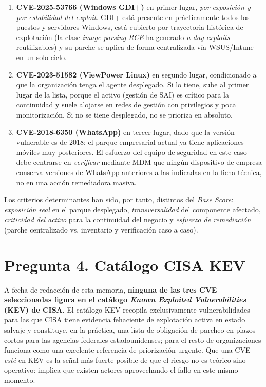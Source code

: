 \begin{enumerate}[leftmargin=*]
    \item \textbf{CVE-2025-53766 (Windows GDI+)} en primer lugar, \textit{por exposición y por estabilidad del exploit}. GDI+ está presente en prácticamente todos los puestos y servidores Windows, está cubierto por trayectoria histórica de explotación (la clase \textit{image parsing RCE} ha generado \textit{n-day exploits} reutilizables) y su parche se aplica de forma centralizada vía WSUS/Intune en un solo ciclo.
    \item \textbf{CVE-2023-51582 (ViewPower Linux)} en segundo lugar, condicionado a que la organización tenga el agente desplegado. Si lo tiene, sube al primer lugar de la lista, porque el activo (gestión de SAI) es crítico para la continuidad y suele alojarse en redes de gestión con privilegios y poca monitorización. Si no se tiene desplegado, no se prioriza en absoluto.
    \item \textbf{CVE-2018-6350 (WhatsApp)} en tercer lugar, dado que la versión vulnerable es de 2018; el parque empresarial actual ya tiene aplicaciones móviles muy posteriores. El esfuerzo del equipo de seguridad en este caso debe centrarse en \textit{verificar} mediante MDM que ningún dispositivo de empresa conserva versiones de WhatsApp anteriores a las indicadas en la ficha técnica, no en una acción remediadora masiva.
\end{enumerate}

Los criterios determinantes han sido, por tanto, distintos del \textit{Base Score}: \textit{exposición real} en el parque desplegado, \textit{transversalidad} del componente afectado, \textit{criticidad del activo} para la continuidad del negocio y \textit{esfuerzo de remediación} (parche centralizado vs. inventario y verificación caso a caso).

\section*{Pregunta 4. Catálogo CISA KEV}

A fecha de redacción de esta memoria, \textbf{ninguna de las tres CVE seleccionadas figura en el catálogo \textit{Known Exploited Vulnerabilities} (KEV) de CISA}. El catálogo KEV recopila exclusivamente vulnerabilidades para las que CISA tiene evidencia fehaciente de explotación activa en estado salvaje y constituye, en la práctica, una lista de obligación de parcheo en plazos cortos para las agencias federales estadounidenses; para el resto de organizaciones funciona como una excelente referencia de priorización urgente. Que una CVE \textit{esté} en KEV es la señal más fuerte posible de que el riesgo no es teórico sino operativo: implica que existen actores aprovechando el fallo en este mismo momento.

